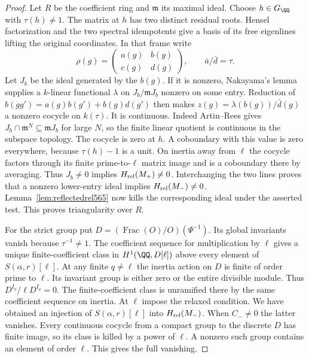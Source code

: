 \documentclass[a4paper,11pt]{article}
\theoremstyle{definition}
\theoremstyle{remark}
\numberwithin{equation}{section}
\begin{document}
\begin{proof}
Let \(R\) be the coefficient ring and \(\mathfrak m\) its maximal
ideal. Choose \(h\in G_\QQ\) with \(\tau(h)\ne1\). The matrix
at \(h\) has two distinct residual roots. Hensel factorization
and the two spectral idempotents give a basis of its free
eigenlines lifting the original coordinates. In that frame write
\[
      \rho(g)=
        \begin{pmatrix}a(g)&b(g)\\ c(g)&d(g)\end{pmatrix},
      \qquad \bar a/\bar d=\tau .
\]
Let \(J_b\) be the ideal generated by the \(b(g)\). If it is
nonzero, Nakayama's lemma supplies a \(k\)-linear functional
\(\lambda\) on \(J_b/\mathfrak m J_b\) nonzero on some entry.
Reduction of
\(b(gg')=a(g)b(g')+b(g)d(g')\) then makes
\(z(g)=\lambda(b(g))/\bar d(g)\) a nonzero cocycle on
\(k(\tau)\). It is continuous. Indeed Artin--Rees gives
\(J_b\cap\mathfrak m^N\subseteq\mathfrak m J_b\) for large
\(N\), so the finite linear quotient is continuous in the
subspace topology. The cocycle is zero at \(h\). A coboundary
with this value is zero everywhere, because \(\tau(h)-1\)
is a unit. On inertia away from \(\ell\) the cocycle factors
through its finite prime-to-\(\ell\) matrix image and is a
coboundary there by averaging. Thus \(J_b\ne0\) implies
\(H_{\rm rel}(M_+)\ne0\). Interchanging the two lines proves
that a nonzero lower-entry ideal implies \(H_{\rm rel}(M_-)\ne0\).
Lemma~\ref{lem:reflectedrel565} now kills the corresponding
ideal under the asserted test. This proves triangularity over \(R\).

For the strict group put \(D=(\operatorname{Frac}(O)/O)(\Psi^{-1})\).
Its global invariants vanish because \(\tau^{-1}\ne1\).
The coefficient sequence for multiplication by \(\ell\) gives
a unique finite-coefficient class in \(H^1(\QQ,D[\ell])\) above
every element of \(S(\alpha,r)[\ell]\). At any finite
\(q\ne\ell\) the inertia action on \(D\) is finite of order
prime to \(\ell\). Its invariant group is either zero or the
entire divisible module. Thus \(D^{I_q}/\ell D^{I_q}=0\).
The finite-coefficient class is unramified there by the same
coefficient sequence on inertia. At \(\ell\) impose the relaxed
condition. We have obtained an injection of \(S(\alpha,r)[\ell]\)
into \(H_{\rm rel}(M_-)\). When \(C_-\ne0\) the latter vanishes.
Every continuous cocycle from a compact group to the discrete
\(D\) has finite image, so its class is killed by a power of
\(\ell\). A nonzero such group contains an element of order
\(\ell\). This gives the full vanishing.
\end{proof}
\end{document}
